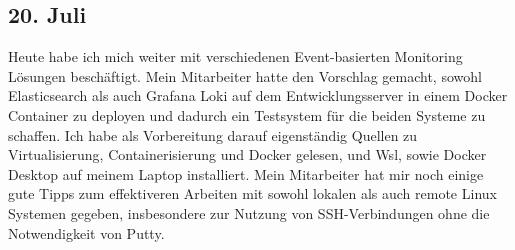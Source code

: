 \subsection{20. Juli}
Heute habe ich mich weiter mit verschiedenen Event-basierten Monitoring Lösungen beschäftigt. Mein Mitarbeiter hatte den Vorschlag gemacht, sowohl Elasticsearch als auch Grafana Loki auf dem Entwicklungsserver in einem Docker Container zu deployen und dadurch ein Testsystem für die beiden Systeme zu schaffen. Ich habe als Vorbereitung darauf eigenständig Quellen zu Virtualisierung, Containerisierung und Docker gelesen, und Wsl, sowie Docker Desktop auf meinem Laptop installiert. Mein Mitarbeiter hat mir noch einige gute Tipps zum effektiveren Arbeiten mit sowohl lokalen als auch remote Linux Systemen gegeben, insbesondere zur Nutzung von SSH-Verbindungen ohne die Notwendigkeit von Putty.